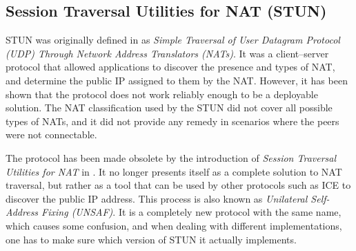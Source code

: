 
\subsection{Session Traversal Utilities for NAT (STUN)}

STUN was originally defined in \cite{rfc3489} as \textit{Simple Traversal of User Datagram Protocol (UDP) Through Network Address Translators (NATs)}. It was a client–server protocol that allowed applications to discover the presence and types of NAT, and determine the public IP assigned to them by the NAT. However, it has been shown that the protocol does not work reliably enough to be a deployable solution. The NAT classification used by the STUN did not cover all possible types of NATs, and it did not provide any remedy in scenarios where the peers were not connectable.


The protocol has been made obsolete by the introduction of \textit{Session Traversal Utilities for NAT} in \cite{rfc5389}. It no longer presents itself as a complete solution to NAT traversal, but rather as a tool that can be used by other protocols such as ICE to discover the public IP address. This process is also known as \textit{Unilateral Self-Address Fixing (UNSAF)}. It is a completely new protocol with the same name, which causes some confusion, and when dealing with different implementations, one has to make sure which version of STUN it actually implements.

